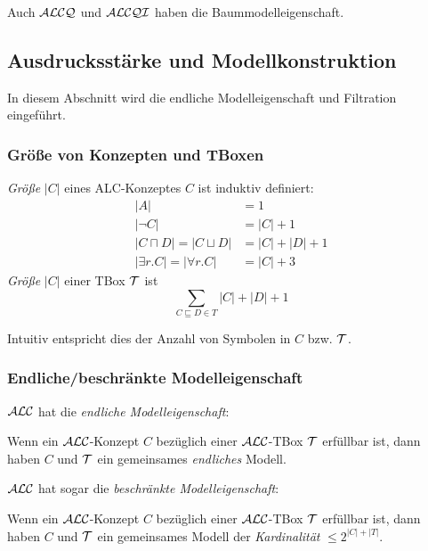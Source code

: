 Auch $\mathcal{A}\mathcal{L}\mathcal{C}\mathcal{Q}$ und $\mathcal{A}\mathcal{L}\mathcal{C}\mathcal{Q}\mathcal{I}$ haben die Baummodelleigenschaft.

\subsection{Ausdrucksstärke und
Modellkonstruktion}\label{ausdrucksstuxe4rke-und-modellkonstruktion}

In diesem Abschnitt  wird die endliche Modelleigenschaft und Filtration eingeführt.

\subsubsection{Größe von Konzepten und
TBoxen}\label{gruxf6uxdfe-von-konzepten-und-tboxen}

\begin{definition}[Größe]
\emph{Größe} $\left| C \right|$ eines ALC-Konzeptes $C$ ist induktiv
definiert:
\begin{align*}
    \left| A \right| &= 1\\
    \left| \neg C \right| &= \left| C \right| + 1\\
    \left| C \sqcap D \right| = \left| C \sqcup D \right| &= \left| C \right| + \left| D \right| + 1\\
    \left| \exists r.C \right| = \left| \forall r.C \right| &= \left| C \right| + 3
\end{align*}
\emph{Größe} $\left| C \right|$ einer TBox $\mathcal{T}$ ist
\[
  \sum_{C \sqsubseteq D \in T} \left| C \right| + \left| D \right| + 1
  \]
\end{definition}

Intuitiv entspricht dies der Anzahl von Symbolen in $C$ bzw. $\mathcal{T}$.

\subsubsection{Endliche/beschränkte Modelleigenschaft}

$\mathcal{A}\mathcal{L}\mathcal{C}$ hat die \emph{endliche Modelleigenschaft}:

\begin{theorem}
Wenn ein $\mathcal{A}\mathcal{L}\mathcal{C}$-Konzept $C$ bezüglich einer $\mathcal{A}\mathcal{L}\mathcal{C}$-TBox $\mathcal{T}$ erfüllbar ist, dann haben $C$ und $\mathcal{T}$ ein gemeinsames \emph{endliches} Modell.
\end{theorem}

$\mathcal{A}\mathcal{L}\mathcal{C}$ hat sogar die \emph{beschränkte Modelleigenschaft}:

\begin{theorem}
Wenn ein $\mathcal{A}\mathcal{L}\mathcal{C}$-Konzept $C$ bezüglich einer $\mathcal{A}\mathcal{L}\mathcal{C}$-TBox $\mathcal{T}$ erfüllbar ist, dann haben $C$ und $\mathcal{T}$ ein gemeinsames Modell der \emph{Kardinalität} $\leq 2^{|C|+|T|}$.
\end{theorem}

